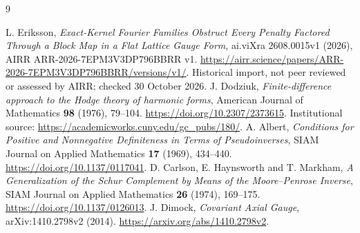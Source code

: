 \documentclass[11pt]{article}
\begin{document}
\begin{thebibliography}{9}
\raggedright
{} L. Eriksson, \emph{Exact-Kernel Fourier Families Obstruct
Every Penalty Factored Through a Block Map in a Flat Lattice Gauge Form},
ai.viXra 2608.0015v1 (2026), AIRR ARR-2026-7EPM3V3DP796BBRR v1.
\url{https://airr.science/papers/ARR-2026-7EPM3V3DP796BBRR/versions/v1/}.
Historical import, not peer reviewed or assessed by AIRR; checked 30 October 2026.
 J. Dodziuk, \emph{Finite-difference approach to the Hodge
theory of harmonic forms}, American Journal of Mathematics \textbf{98}
(1976), 79--104. \url{https://doi.org/10.2307/2373615}.
Institutional source: \url{https://academicworks.cuny.edu/gc_pubs/180/}.
 A. Albert, \emph{Conditions for Positive and Nonnegative
Definiteness in Terms of Pseudoinverses}, SIAM Journal on Applied Mathematics
\textbf{17} (1969), 434--440. \url{https://doi.org/10.1137/0117041}.
 D. Carlson, E. Haynsworth and T. Markham,
\emph{A Generalization of the Schur Complement by Means of the Moore--Penrose
Inverse}, SIAM Journal on Applied Mathematics \textbf{26} (1974), 169--175.
\url{https://doi.org/10.1137/0126013}.
 J. Dimock, \emph{Covariant Axial Gauge},
arXiv:1410.2798v2 (2014). \url{https://arxiv.org/abs/1410.2798v2}.
\end{thebibliography}
\end{document}
